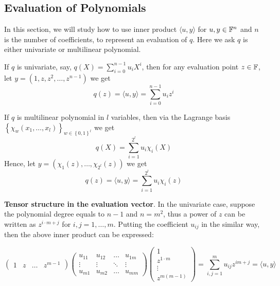 \documentclass{article}
\begin{document}
\subsection{Evaluation of Polynomials} \label{sec:eval-polyn}

In this section, we will study how to use inner product $\langle u, y \rangle$ for $u, y \in \mathbb{F}^n$ and $n$ is the number of coefficients, to represent an evaluation of $q$. Here we ask $q$ is either univariate or multilinear polynomial.

If $q$ is univariate, say, $q(X) = \sum_{i = 0}^{n-1} u_i X^i$, then for any evaluation point $z \in \mathbb{F}$, let $y = (1, z, z^2, \dots, z^{n-1})$ we get 
\begin{equation*}
q(z) = \langle u, y \rangle = \sum_{i = 0}^{n-1} u_i z^i
\end{equation*}

If $q$ is multilinear polynomial in $l$ variables, then via the Lagrange basis $\left\{ \chi_{w}(x_1, \dots, x_l) \right\}_{w \in \left\{ 0, 1 \right\}^l}$ we get
\begin{equation*}
q(X) = \sum_{i = 1}^{2^l} u_i \chi_i(X)
\end{equation*}
Hence, let $y = (\chi_1(z), \dots, \chi_{2^l}(z))$ we get
\begin{equation*}
q(z) = \langle u, y \rangle = \sum_{i = 1}^{2^l} u_i \chi_i(z)
\end{equation*}

\textbf{Tensor structure in the evaluation vector}. In the univariate case, suppose the polynomial degree equals to $n-1$ and $n = m^2$, thus a power of $z$ can be written as  $z^{i \cdot m + j}$ for $i, j = 1, \dots, m$. Putting the coefficient $u_{ij}$ in the similar way, then the above inner product can be expressed:

\begin{equation} \label{eq:q(z)-matrix}
\begin{pmatrix}
1 & z & \dots & z^{m-1}
\end{pmatrix}
\begin{pmatrix}
u_{11}  & u_{12}   & \dots  & u_{1m} \\
\vdots & \vdots  & \ddots & \vdots \\
u_{m1}  & u_{m2}  &\dots     & u_{mm}
\end{pmatrix}
\begin{pmatrix}
1 \\
z^{1 \cdot m} \\
\vdots \\
z^{m(m-1)}
\end{pmatrix}
= \sum_{i, j = 1}^m u_{ij} z^{im + j} = \langle u, y \rangle
\end{equation}  
\end{document}
